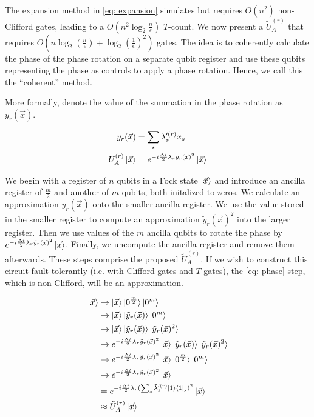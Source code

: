 The expansion method in \eqref{eq: expansion} simulates but requires $O(n^2)$ non-Clifford gates, leading to a $O(n^2\log_2{\frac{n}{\epsilon}})$ $T$-count. We now present a $\tilde{U}_A^{(r)}$ that requires $O(n\log_2(\frac{n}{\epsilon}) + \log_2(\frac{1}{\epsilon})^2)$ gates. The idea is to coherently calculate the phase of the phase rotation on a separate qubit register and use these qubits representing the phase as controls to apply a phase rotation. Hence, we call this the ``coherent'' method.

More formally, denote the value of the summation in the phase rotation as $y_r(\vec{x})$.

\begin{equation}
    \begin{split}
        y_r(\vec{x}) &= \sum_s \lambda'^{(r)}_s x_s \\
        U_A^{(r)}\ket{\vec{x}} &= e^{-i\frac{\Delta t}{2}\lambda_ry_r(\vec{x})^2}\ket{\vec{x}}
    \end{split}
\end{equation}

We begin with a register of $n$ qubits in a Fock state $\ket{\vec{x}}$ and introduce an ancilla register of $\frac{m}{2}$ and another of $m$ qubits, both initalized to zeros. We calculate an approximation $\tilde{y}_r(\vec{x})$ onto the smaller ancilla register. We use the value stored in the smaller register to compute an approximation $\tilde{y}_r(\vec{x})^2$ into the larger register. Then we use values of the $m$ ancilla qubits to rotate the phase by $e^{-i\frac{\Delta t}{2}\lambda_r\tilde{y}_r(\vec{x})^2}\ket{\vec{x}}$. Finally, we uncompute the ancilla register and remove them afterwards. These steps comprise the proposed $\tilde{U}_A^{(r)}$. If we wish to construct this circuit fault-tolerantly (i.e. with Clifford gates and $T$ gates), the \eqref{eq: phase} step, which is non-Clifford, will be an approximation. 

\begin{align}
    \ket{\vec{x}} &\rightarrow \ket{\vec{x}}\ket{0^{\frac{m}{2}}}\ket{0^m} \\
    &\rightarrow \ket{\vec{x}}\ket{\tilde{y}_r(\vec{x})}\ket{0^m} \label{eq: summation}\\
    &\rightarrow \ket{\vec{x}}\ket{\tilde{y}_r(\vec{x})}\ket{\tilde{y}_r(\vec{x})^2} \label{eq: squaring} \\
    &\rightarrow e^{-i\frac{\Delta t}{2}\lambda_r\tilde{y}_r(\vec{x})^2}\ket{\vec{x}}\ket{\tilde{y}_r(\vec{x})}\ket{\tilde{y}_r(\vec{x})^2} \label{eq: phase} \\
    &\rightarrow e^{-i\frac{\Delta t}{2}\lambda_r\tilde{y}_r(\vec{x})^2}\ket{\vec{x}}\ket{0^{\frac{m}{2}}}\ket{0^m} \\
    &\rightarrow e^{-i\frac{\Delta t}{2}\lambda_r\tilde{y}_r(\vec{x})^2}\ket{\vec{x}} \\
    &= e^{-i\frac{\Delta t}{2}\lambda_r(\sum_s \tilde{\lambda}'^{(r)}_s \ket{1}\bra{1}_s)^2}\ket{\vec{x}} \\
    &\approx \tilde{U}_A^{(r)}\ket{\vec{x}}
\end{align}

